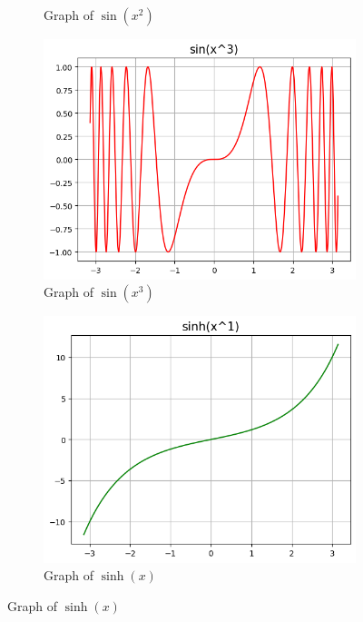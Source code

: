 \documentclass{article}
\begin{document}
\begin{figure}[h!]
\begin{subfigure}[t]{0.3\textwidth}
            \caption{Graph of $\sin(x^2)$}
            \label{fig:sin-x2}
        \end{subfigure}       
        \hfill
        \begin{subfigure}[t]{0.3\textwidth}
            \includegraphics[width=\textwidth]{params/sin-x3.png}
            \caption{Graph of $\sin(x^3)$}
            \label{fig:sin-x3}
        \end{subfigure}
        \newline
        \begin{subfigure}[t]{0.3\textwidth}
            \includegraphics[width=\textwidth]{params/sinh-x1.png}
            \caption{Graph of $\sinh(x)$}

\end{subfigure}
\end{figure}
\end{document}
